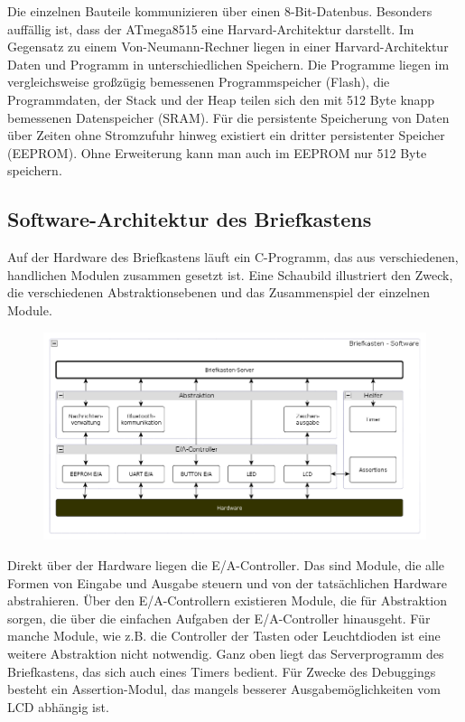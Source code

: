 \documentclass[ngerman]{article}
\begin{document}
Die einzelnen Bauteile kommunizieren über einen 8-Bit-Datenbus. Besonders
auffällig ist, dass der ATmega8515 eine Harvard-Architektur darstellt. Im
Gegensatz zu einem Von-Neumann-Rechner liegen in einer Harvard-Architektur
Daten und Programm in unterschiedlichen Speichern. Die Programme liegen im
vergleichsweise großzügig bemessenen Programmspeicher (Flash), die
Programmdaten, der Stack und der Heap teilen sich den mit 512 Byte knapp
bemessenen Datenspeicher (SRAM). Für die persistente Speicherung von Daten über
Zeiten ohne Stromzufuhr hinweg existiert ein dritter persistenter Speicher
(EEPROM).  Ohne Erweiterung kann man auch im EEPROM nur 512 Byte speichern.


\subsection{Software-Architektur des Briefkastens}

Auf der Hardware des Briefkastens läuft ein C-Programm, das aus verschiedenen,
handlichen Modulen zusammen gesetzt ist. Eine Schaubild illustriert den Zweck,
die verschiedenen Abstraktionsebenen und das Zusammenspiel der einzelnen
Module.

\begin{figure}[h!] \begin{center}
    \includegraphics[width=\textwidth]{media/letterbox-arch}
\end{center} \end{figure}

Direkt über der Hardware liegen die E/A-Controller. Das sind Module, die alle
Formen von Eingabe und Ausgabe steuern und von der tatsächlichen Hardware
abstrahieren. Über den E/A-Controllern existieren Module, die für Abstraktion
sorgen, die über die einfachen Aufgaben der E/A-Controller hinausgeht. Für
manche Module, wie z.B. die Controller der Tasten oder Leuchtdioden ist eine
weitere Abstraktion nicht notwendig. Ganz oben liegt das Serverprogramm des
Briefkastens, das sich auch eines Timers bedient. Für Zwecke des Debuggings
besteht ein Assertion-Modul, das mangels besserer Ausgabemöglichkeiten vom LCD
abhängig ist.
\end{document}
